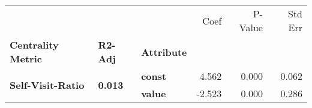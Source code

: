 \begin{tabular}{lllrrr}
\toprule
                 &       &       &   Coef &  P-Value &  Std Err \\
\textbf{Centrality Metric} & \textbf{R2-Adj} & \textbf{Attribute} &        &          &          \\
\midrule
\multirow{2}{*}{\textbf{Self-Visit-Ratio}} & \multirow{2}{*}{\textbf{0.013}} & \textbf{const} &  4.562 &    0.000 &    0.062 \\
                 &       & \textbf{value} & -2.523 &    0.000 &    0.286 \\
\bottomrule
\end{tabular}
